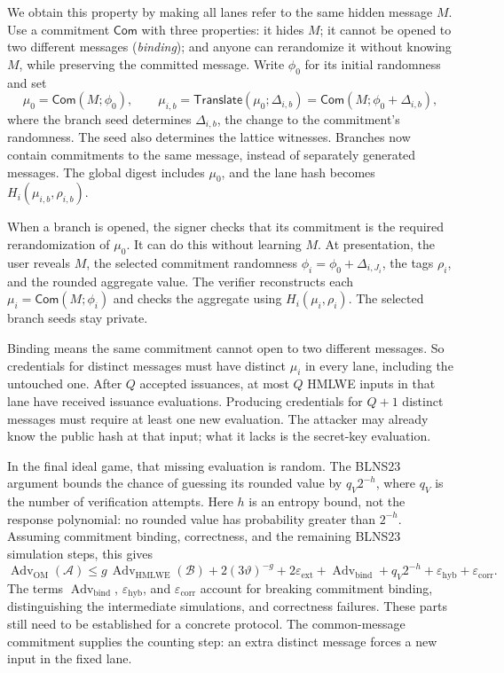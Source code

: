 \documentclass[10pt]{article}
\begin{document}
We obtain this property by making all lanes refer to the same hidden message
$M$.  Use a commitment $\mathsf{Com}$ with three properties: it hides $M$;
it cannot be opened to two different messages (\emph{binding}); and anyone
can rerandomize it without knowing $M$, while preserving the committed
message.  Write $\phi_0$ for its initial randomness and set
\[
 \mu_0=\mathsf{Com}(M;\phi_0),\qquad
 \mu_{i,b}=\mathsf{Translate}(\mu_0;\Delta_{i,b})
           =\mathsf{Com}(M;\phi_0+\Delta_{i,b}),
\]
where the branch seed determines $\Delta_{i,b}$, the change to the commitment's
randomness.  The seed also determines the lattice witnesses.  Branches now contain
commitments to the same message, instead of separately generated messages.
The global digest includes $\mu_0$, and the lane hash becomes
$H_i(\mu_{i,b},\rho_{i,b})$.

When a branch is opened, the signer checks that its commitment is the
required rerandomization of $\mu_0$.  It can do this without learning $M$.
At presentation, the user reveals $M$, the selected commitment randomness
$\phi_i=\phi_0+\Delta_{i,J_i}$, the tags $\rho_i$, and the rounded aggregate
value.  The verifier reconstructs each $\mu_i=\mathsf{Com}(M;\phi_i)$ and
checks the aggregate using $H_i(\mu_i,\rho_i)$.  The selected branch seeds
stay private.

Binding means the same commitment cannot open to two different messages.
So credentials for distinct messages must have distinct $\mu_i$ in every
lane, including the untouched one.  After $Q$ accepted issuances, at most
$Q$ HMLWE inputs in that lane have received issuance evaluations.  Producing
credentials for $Q+1$ distinct messages must require at least one new
evaluation.  The attacker may already know the public hash at that input;
what it lacks is the secret-key evaluation.

In the final ideal game, that missing evaluation is random.  The BLNS23
argument bounds the chance of guessing its rounded value by $q_V2^{-h}$,
where $q_V$ is the number of verification attempts.  Here $h$ is an entropy
bound, not the response polynomial: no rounded value has probability greater
than $2^{-h}$.  Assuming commitment binding, correctness, and the remaining
BLNS23 simulation steps, this gives
\[
 \operatorname{Adv}_{\mathrm{OM}}(\mathcal A)
 \leq
 g\,\operatorname{Adv}_{\mathrm{HMLWE}}(\mathcal B)
 +2(3\vartheta)^{-g}+2\varepsilon_{\mathrm{ext}}
 +\operatorname{Adv}_{\mathrm{bind}}+q_V2^{-h}
 +\varepsilon_{\mathrm{hyb}}+\varepsilon_{\mathrm{corr}}.
\]
The terms $\operatorname{Adv}_{\mathrm{bind}}$,
$\varepsilon_{\mathrm{hyb}}$, and $\varepsilon_{\mathrm{corr}}$ account for
breaking commitment binding, distinguishing the intermediate simulations,
and correctness failures.  These parts still need to be established for a
concrete protocol.  The common-message commitment supplies the counting step:
an extra distinct message forces a new input in the fixed lane.
\end{document}
